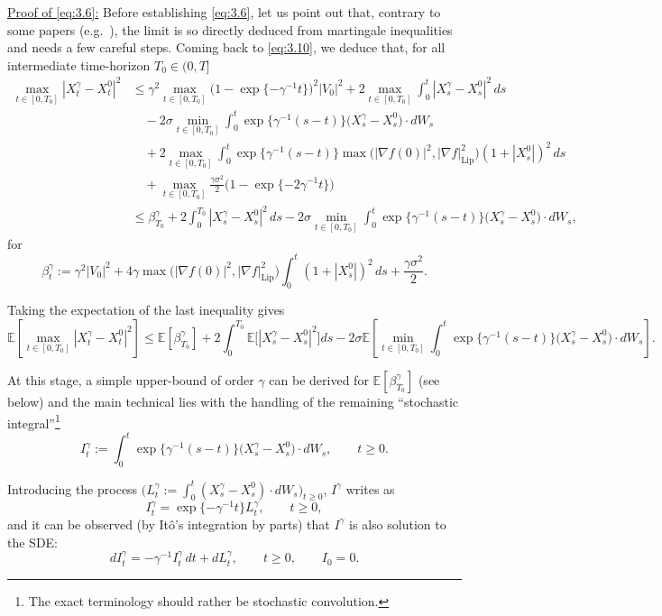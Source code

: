 \documentclass[11pt]{article}
\begin{document}
\underline{Proof of \eqref{eq:3.6}:}
Before establishing \eqref{eq:3.6}, let us point out that, contrary to some papers (e.g.~\cite{f04}), the limit is so directly deduced from martingale inequalities and needs a few careful steps.
Coming back to \eqref{eq:3.10}, we deduce that, for all intermediate time-horizon $T_0\in(0,T]$
\[
\begin{aligned}
\max_{t\in[0,T_0]}|X_t^{\gamma}-X_t^0|^2
&\le \gamma^2\max_{t\in[0,T_0]}\bigl(1-\exp\{-\gamma^{-1}t\}\bigr)^2|V_0|^2+2\max_{t\in[0,T_0]}\int_0^t |X_s^{\gamma}-X_s^0|^2\,ds \\
&\quad -2\sigma\min_{t\in[0,T_0]}\int_0^t \exp\{\gamma^{-1}(s-t)\}\bigl(X_s^{\gamma}-X_s^0\bigr)\cdot dW_s \\
&\quad +2\max_{t\in[0,T_0]}\int_0^t \exp\{\gamma^{-1}(s-t)\}\max\bigl(|\nabla f(0)|^2,|\nabla f|_{\mathrm{Lip}}^2\bigr)(1+|X_s^0|)^2\,ds \\
&\quad +\max_{t\in[0,T_0]}\frac{\gamma\sigma^2}{2}\bigl(1-\exp\{-2\gamma^{-1}t\}\bigr) \\
&\le \beta_{T_0}^{\gamma}+2\int_0^{T_0}|X_s^{\gamma}-X_s^0|^2\,ds-2\sigma\min_{t\in[0,T_0]}\int_0^t \exp\{\gamma^{-1}(s-t)\}\bigl(X_s^{\gamma}-X_s^0\bigr)\cdot dW_s,
\end{aligned}
\]
for
\[
\beta_t^{\gamma}:=\gamma^2|V_0|^2+4\gamma\max\bigl(|\nabla f(0)|^2,|\nabla f|_{\mathrm{Lip}}^2\bigr)\int_0^t (1+|X_s^0|)^2\,ds+\frac{\gamma\sigma^2}{2}.
\]

Taking the expectation of the last inequality gives
\[
\mathbb{E}\left[\max_{t\in[0,T_0]}|X_t^{\gamma}-X_t^0|^2\right]\le \mathbb{E}[\beta_{T_0}^{\gamma}]+2\int_0^{T_0}\mathbb{E}\bigl[|X_s^{\gamma}-X_s^0|^2\bigr]ds-2\sigma\mathbb{E}\left[\min_{t\in[0,T_0]}\int_0^t \exp\{\gamma^{-1}(s-t)\}\bigl(X_s^{\gamma}-X_s^0\bigr)\cdot dW_s\right].
\]

At this stage, a simple upper-bound of order $\gamma$ can be derived for $\mathbb{E}[\beta_{T_0}^{\gamma}]$ (see below) and the main technical lies with the handling of the remaining ``stochastic integral''\footnote{The exact terminology should rather be stochastic convolution.}
\[
I_t^{\gamma}:=\int_0^t \exp\{\gamma^{-1}(s-t)\}\bigl(X_s^{\gamma}-X_s^0\bigr)\cdot dW_s,\qquad t\ge 0.
\]


Introducing the process $\bigl(L_t^{\gamma}:=\int_0^t (X_s^{\gamma}-X_s^0)\cdot dW_s\bigr)_{t\ge0}$, $I^{\gamma}$ writes as
\[
I_t^{\gamma}=\exp\{-\gamma^{-1}t\}L_t^{\gamma},\qquad t\ge0,
\]
and it can be observed (by It\^o's integration by parts) that $I^{\gamma}$ is also solution to the SDE:
\[
dI_t^{\gamma}=-\gamma^{-1}I_t^{\gamma}\,dt+dL_t^{\gamma},\qquad t\ge0,\qquad I_0=0.
\]
\end{document}
